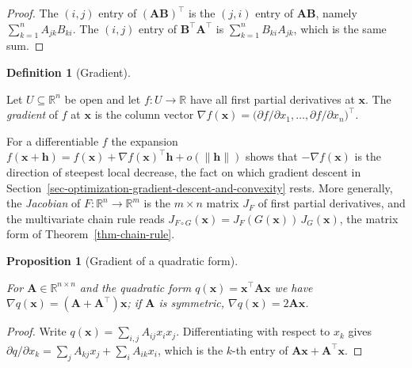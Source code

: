\documentclass[
  english,
  11pt,
  a4paper,
  twoside,
  open=any,
  numbers=noenddot]{scrbook}
\theoremstyle{plain}
\theoremstyle{plain}
\newtheorem{proposition}{Proposition}[chapter]
\theoremstyle{plain}
\theoremstyle{definition}
\newtheorem{definition}{Definition}[chapter]
\theoremstyle{definition}
\theoremstyle{definition}
\theoremstyle{remark}
\begin{document}
\begin{proof}
The \((i,j)\) entry of \((\mathbf{A}\mathbf{B})^\top\) is the \((j,i)\)
entry of \(\mathbf{A}\mathbf{B}\), namely
\(\sum_{k=1}^n A_{jk} B_{ki}\). The \((i,j)\) entry of
\(\mathbf{B}^\top\mathbf{A}^\top\) is \(\sum_{k=1}^n B_{ki} A_{jk}\),
which is the same sum.
\end{proof}

\begin{definition}[Gradient]\protect\hypertarget{def-gradient}{}\label{def-gradient}

Let \(U \subseteq \mathbb{R}^n\) be open and let
\(f\colon U \to \mathbb{R}\) have all first partial derivatives at
\(\mathbf{x}\). The \emph{gradient} of \(f\) at
\(\mathbf{x}\) is the column vector
\(\nabla f(\mathbf{x}) = \big(\partial f/\partial x_1, \dots, \partial f/\partial x_n\big)^\top\).

\end{definition}

For a differentiable \(f\) the expansion
\(f(\mathbf{x}+\mathbf{h}) = f(\mathbf{x}) + \nabla f(\mathbf{x})^\top \mathbf{h} + o(\lVert \mathbf{h}\rVert)\)
shows that \(-\nabla f(\mathbf{x})\) is the direction of steepest local
decrease, the fact on which gradient descent in
Section~\ref{sec-optimization-gradient-descent-and-convexity} rests.
More generally, the \emph{Jacobian} of
\(F\colon \mathbb{R}^n \to \mathbb{R}^m\) is the \(m\times n\) matrix
\(J_F\) of first partial derivatives, and the multivariate chain rule
reads
\(J_{F\circ G}(\mathbf{x}) = J_F(G(\mathbf{x}))\,J_G(\mathbf{x})\), the
matrix form of Theorem~\ref{thm-chain-rule}.

\begin{proposition}[Gradient of a quadratic
form]\protect\hypertarget{prp-quadratic-gradient}{}\label{prp-quadratic-gradient}

For \(\mathbf{A}\in\mathbb{R}^{n\times n}\) and the quadratic
form
\(q(\mathbf{x}) = \mathbf{x}^\top \mathbf{A}\mathbf{x}\) we have
\(\nabla q(\mathbf{x}) = (\mathbf{A} + \mathbf{A}^\top)\mathbf{x}\); if
\(\mathbf{A}\) is symmetric,
\(\nabla q(\mathbf{x}) = 2\mathbf{A}\mathbf{x}\).

\end{proposition}

\begin{proof}
Write \(q(\mathbf{x}) = \sum_{i,j} A_{ij} x_i x_j\). Differentiating
with respect to \(x_k\) gives
\(\partial q/\partial x_k = \sum_j A_{kj} x_j + \sum_i A_{ik} x_i\),
which is the \(k\)-th entry of
\(\mathbf{A}\mathbf{x} + \mathbf{A}^\top \mathbf{x}\).
\end{proof}
\end{document}
